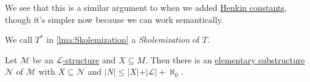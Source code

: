 \begin{note}
	We see that this is a similar argument to when we added \hyperref[def:Henkin-constant]{Henkin constants}, though it's simpler now because we can work semantically.
\end{note}

\begin{notation}[Skolemization]\label{not:Skolemization}
	We call \(T^{\ast} \) in \autoref{lma:Skolemization} a \emph{Skolemization} of \(T\).
\end{notation}

\begin{theorem}\label{thm:downward-Lowenheim-Skolem}
	Let \(\mathcal{M} \) be an \hyperref[def:structure]{\(\mathcal{L} \)-structure} and \(X \subseteq M\). Then there is an \hyperref[def:elementary-substructure]{elementary substructure} \(\mathcal{N} \) of \(\mathcal{M} \) with \(X \subseteq \mathcal{N} \) and \(\vert N \vert \leq \vert X \vert + \vert \mathcal{L} \vert + \aleph_0\).
\end{theorem}
